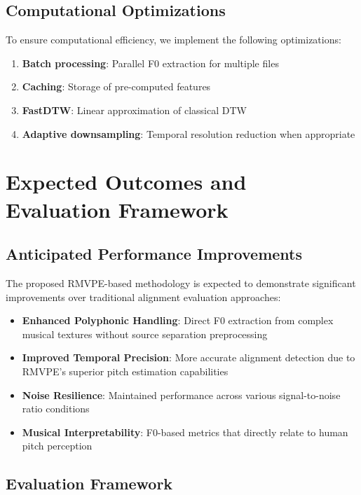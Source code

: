 \documentclass[12pt,a4paper]{article}
\begin{document}
\subsection{Computational Optimizations}

To ensure computational efficiency, we implement the following optimizations:

\begin{enumerate}
    \item \textbf{Batch processing}: Parallel F0 extraction for multiple files
    \item \textbf{Caching}: Storage of pre-computed features
    \item \textbf{FastDTW}: Linear approximation of classical DTW
    \item \textbf{Adaptive downsampling}: Temporal resolution reduction when appropriate
\end{enumerate}

\section{Expected Outcomes and Evaluation Framework}
\label{sec:resultados}

\subsection{Anticipated Performance Improvements}

The proposed RMVPE-based methodology is expected to demonstrate significant improvements over traditional alignment evaluation approaches:

\begin{itemize}
    \item \textbf{Enhanced Polyphonic Handling}: Direct F0 extraction from complex musical textures without source separation preprocessing
    \item \textbf{Improved Temporal Precision}: More accurate alignment detection due to RMVPE's superior pitch estimation capabilities
    \item \textbf{Noise Resilience}: Maintained performance across various signal-to-noise ratio conditions
    \item \textbf{Musical Interpretability}: F0-based metrics that directly relate to human pitch perception
\end{itemize}

\subsection{Evaluation Framework}
\end{document}
